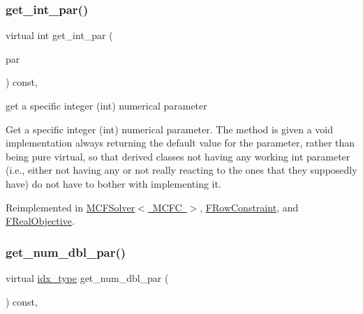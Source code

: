 \subsubsection{\texorpdfstring{get\+\_\+int\+\_\+par()}{get\_int\_par()}}
{\footnotesize\ttfamily virtual int get\+\_\+int\+\_\+par (\begin{DoxyParamCaption}\item[{const \mbox{\hyperlink{class_s_m_spp__di__unipi__it_1_1_thin_compute_interface_aa3d710629ad8c434286726ad810c3b47}{idx\+\_\+type}}}]{par }\end{DoxyParamCaption}) const\hspace{0.3cm}{\ttfamily [inline]}, {\ttfamily [virtual]}}



get a specific integer (int) numerical parameter 

Get a specific integer (int) numerical parameter. The method is given a void implementation always returning the default value for the parameter, rather than being pure virtual, so that derived classes not having any working int parameter (i.\+e., either not having any or not really reacting to the ones that they supposedly have) do not have to bother with implementing it. 

Reimplemented in \mbox{\hyperlink{class_s_m_spp__di__unipi__it_1_1_m_c_f_solver_aaaa5e72533153b149c26c1cc7ab1fe70}{M\+C\+F\+Solver$<$ M\+C\+F\+C $>$}}, \mbox{\hyperlink{class_s_m_spp__di__unipi__it_1_1_f_row_constraint_aaaa5e72533153b149c26c1cc7ab1fe70}{F\+Row\+Constraint}}, and \mbox{\hyperlink{class_s_m_spp__di__unipi__it_1_1_f_real_objective_aaaa5e72533153b149c26c1cc7ab1fe70}{F\+Real\+Objective}}.

\mbox{\label{class_s_m_spp__di__unipi__it_1_1_thin_compute_interface_a03d2492bc7caa7e7821fa1bc4f06a36e}} 
\subsubsection{\texorpdfstring{get\+\_\+num\+\_\+dbl\+\_\+par()}{get\_num\_dbl\_par()}}
{\footnotesize\ttfamily virtual \mbox{\hyperlink{class_s_m_spp__di__unipi__it_1_1_thin_compute_interface_aa3d710629ad8c434286726ad810c3b47}{idx\+\_\+type}} get\+\_\+num\+\_\+dbl\+\_\+par (\begin{DoxyParamCaption}\item[{void}]{ }\end{DoxyParamCaption}) const\hspace{0.3cm}{\ttfamily [inline]}, {\ttfamily [virtual]}}



